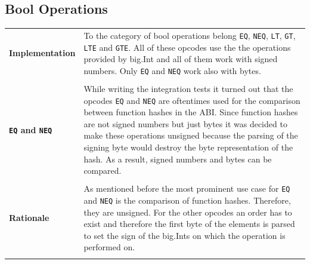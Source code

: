 \subsection{Bool Operations}
\begin{tabular}[t]{ p{3cm} p{12.5cm}}
\raggedright
\textbf{Implementation} &
To the category of bool operations belong \texttt{EQ}, \texttt{NEQ}, \texttt{LT}, \texttt{GT}, \texttt{LTE} and \texttt{GTE}. All of these opcodes use the the operations provided by big.Int and all of them work with signed numbers. Only \texttt{EQ} and \texttt{NEQ} work also with bytes. \\ \\
\raggedright
\textbf{\texttt{EQ} and \texttt{NEQ}} &
While writing the integration tests it turned out that the opcodes \texttt{EQ} and \texttt{NEQ} are oftentimes used for the comparison between function hashes in the ABI. Since function hashes are not signed numbers but just bytes it was decided to make these operations unsigned because the parsing of the signing byte would destroy the byte representation of the hash. As a result, signed numbers and bytes can be compared. \\ \\

\raggedright
\textbf{Rationale} &
As mentioned before the most prominent use case for \texttt{EQ} and \texttt{NEQ} is the comparison of function hashes. Therefore, they are unsigned. For the other opcodes an order has to exist and therefore the first byte of the elements is parsed to set the sign of the big.Ints on which the operation is performed on. \\ \\
\end{tabular}

